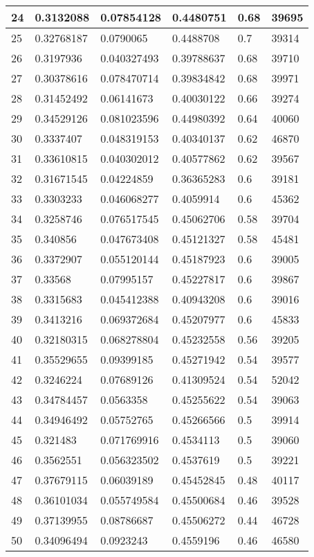 \begin{longtable}{|l|l|l|l|l|l|}
24 & 0.3132088 & 0.07854128 & 0.4480751 & 0.68 & 39695 \\ \hline 
25 & 0.32768187 & 0.0790065 & 0.4488708 & 0.7 & 39314 \\ \hline 
26 & 0.3197936 & 0.040327493 & 0.39788637 & 0.68 & 39710 \\ \hline 
27 & 0.30378616 & 0.078470714 & 0.39834842 & 0.68 & 39971 \\ \hline 
28 & 0.31452492 & 0.06141673 & 0.40030122 & 0.66 & 39274 \\ \hline 
29 & 0.34529126 & 0.081023596 & 0.44980392 & 0.64 & 40060 \\ \hline 
30 & 0.3337407 & 0.048319153 & 0.40340137 & 0.62 & 46870 \\ \hline 
31 & 0.33610815 & 0.040302012 & 0.40577862 & 0.62 & 39567 \\ \hline 
32 & 0.31671545 & 0.04224859 & 0.36365283 & 0.6 & 39181 \\ \hline 
33 & 0.3303233 & 0.046068277 & 0.4059914 & 0.6 & 45362 \\ \hline 
34 & 0.3258746 & 0.076517545 & 0.45062706 & 0.58 & 39704 \\ \hline 
35 & 0.340856 & 0.047673408 & 0.45121327 & 0.58 & 45481 \\ \hline 
36 & 0.3372907 & 0.055120144 & 0.45187923 & 0.6 & 39005 \\ \hline 
37 & 0.33568 & 0.07995157 & 0.45227817 & 0.6 & 39867 \\ \hline 
38 & 0.3315683 & 0.045412388 & 0.40943208 & 0.6 & 39016 \\ \hline 
39 & 0.3413216 & 0.069372684 & 0.45207977 & 0.6 & 45833 \\ \hline 
40 & 0.32180315 & 0.068278804 & 0.45232558 & 0.56 & 39205 \\ \hline 
41 & 0.35529655 & 0.09399185 & 0.45271942 & 0.54 & 39577 \\ \hline 
42 & 0.3246224 & 0.07689126 & 0.41309524 & 0.54 & 52042 \\ \hline 
43 & 0.34784457 & 0.0563358 & 0.45255622 & 0.54 & 39063 \\ \hline 
44 & 0.34946492 & 0.05752765 & 0.45266566 & 0.5 & 39914 \\ \hline 
45 & 0.321483 & 0.071769916 & 0.4534113 & 0.5 & 39060 \\ \hline 
46 & 0.3562551 & 0.056323502 & 0.4537619 & 0.5 & 39221 \\ \hline 
47 & 0.37679115 & 0.06039189 & 0.45452845 & 0.48 & 40117 \\ \hline 
48 & 0.36101034 & 0.055749584 & 0.45500684 & 0.46 & 39528 \\ \hline 
49 & 0.37139955 & 0.08786687 & 0.45506272 & 0.44 & 46728 \\ \hline 
50 & 0.34096494 & 0.0923243 & 0.4559196 & 0.46 & 46580 \\ \hline 
\end{longtable}